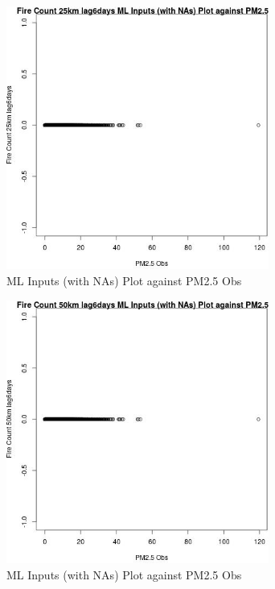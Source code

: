 \begin{figure} 
\centering  
\includegraphics[width=0.77\textwidth]{Code_Outputs/Report_ML_input_PM25_Step4_part_e_de_duplicated_aves_compiled_2019-05-18wNAs_Fire_Count_25km_lag6daysvPM25_Obs.jpg} 
\caption{\label{fig:Report_ML_input_PM25_Step4_part_e_de_duplicated_aves_compiled_2019-05-18wNAsFire_Count_25km_lag6daysvPM25_Obs}ML Inputs (with NAs) Plot against PM2.5 Obs} 
\end{figure} 
 

\begin{figure} 
\centering  
\includegraphics[width=0.77\textwidth]{Code_Outputs/Report_ML_input_PM25_Step4_part_e_de_duplicated_aves_compiled_2019-05-18wNAs_Fire_Count_50km_lag6daysvPM25_Obs.jpg} 
\caption{\label{fig:Report_ML_input_PM25_Step4_part_e_de_duplicated_aves_compiled_2019-05-18wNAsFire_Count_50km_lag6daysvPM25_Obs}ML Inputs (with NAs) Plot against PM2.5 Obs} 
\end{figure} 
 

